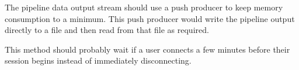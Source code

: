 
\begin{DoxyRefList}
\item[\label{todo__todo000001}%
\hypertarget{todo__todo000001}{}%
Member \hyperlink{classhwm_1_1hardware_1_1pipelines_1_1pipeline_1_1_pipeline_a6105f9720a74d918e3a0b13f727b96a8}{hwm.hardware.pipelines.pipeline.Pipeline.write\-\_\-output} ]The pipeline data output stream should use a push producer to keep memory consumption to a minimum. This push producer would write the pipeline output directly to a file and then read from that file as required. 
\item[\label{todo__todo000002}%
\hypertarget{todo__todo000002}{}%
Member \hyperlink{namespacehwm_1_1network_1_1protocols_1_1utilities_a78d9180aff7807a47984c53273456dd8}{hwm\-:\-:network\-:\-:protocols\-:\-:utilities.load\-\_\-session\-\_\-after\-\_\-tls\-\_\-handshake} ]This method should probably wait if a user connects a few minutes before their session begins instead of immediately disconnecting.
\end{DoxyRefList}